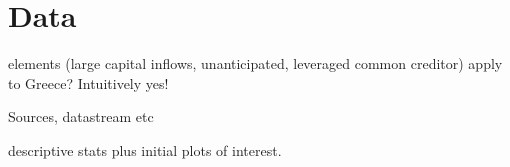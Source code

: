 \documentclass[/../base.tex]{subfiles}
\begin{document}
\section{Data}

\cite{kaminsky2003unholy} elements (large capital inflows, unanticipated, leveraged common creditor) apply to Greece? Intuitively yes!


Sources, datastream etc


descriptive stats plus initial plots of interest.
\end{document}
